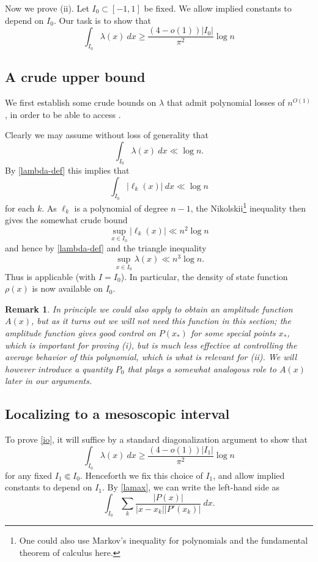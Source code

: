 \documentclass[12pt]{amsart}
\newtheorem{remark}[theorem]{Remark}
\begin{document}
Now we prove (ii).  Let $I_0 \subset [-1,1]$ be fixed.  We allow implied constants to depend on $I_0$.  Our task is to show that
\begin{equation}\label{io}
 \int_{I_0} \lambda(x)\ dx \geq \frac{(4-o(1))|I_0|}{\pi^2} \log n
\end{equation}


\subsection{A crude upper bound}

We first establish some crude bounds on $\lambda$ that admit polynomial losses of $n^{O(1)}$, in order to be able to access .

Clearly we may assume without loss of generality that
$$ \int_{I_0} \lambda(x)\ dx \ll \log n.$$
By \eqref{lambda-def} this implies that
$$ \int_{I_0} |\ell_k(x)|\ dx \ll \log n$$
for each $k$.  As $\ell_k$ is a polynomial of degree $n-1$, the Nikolskii\footnote{One could also use Markov's inequality for polynomials and the fundamental theorem of calculus here.} inequality \cite{kamzolov} then gives the somewhat crude bound
$$ \sup_{x \in I_0} |\ell_k(x)| \ll n^2 \log n$$
and hence by \eqref{lambda-def} and the triangle inequality
$$ \sup_{x \in I_0} \lambda(x) \ll n^3 \log n.$$
Thus  is applicable (with $I=I_0$).  In particular, the density of state function $\rho(x)$ is now available on $I_0$.

\begin{remark}
In principle we could also apply  to obtain an amplitude function $A(x)$, but as it turns out we will not need this function in this section; the amplitude function gives good control on $P(x_*)$ for some special points $x_*$, which is important for proving (i), but is much less effective at controlling the average behavior of this polynomial, which is what is relevant for (ii).  We will however introduce a quantity $P_0$ that plays a somewhat analogous role to $A(x)$ later in our arguments.
\end{remark}

\subsection{Localizing to a mesoscopic interval}

To prove \eqref{io}, it will suffice by a standard diagonalization argument to show that
$$ \int_{I_0} \lambda(x)\ dx \geq \frac{(4-o(1))|I_1|}{\pi^2} \log n$$
for any fixed $I_1 \Subset I_0$.  Henceforth we fix this choice of $I_1$, and allow implied constants to depend on $I_1$.  By \eqref{lamax}, we can write the left-hand side as
$$ \int_{I_0} \sum_{k} \frac{|P(x)|}{|x-x_k| |P'(x_k)|}\ dx.$$
\end{document}

